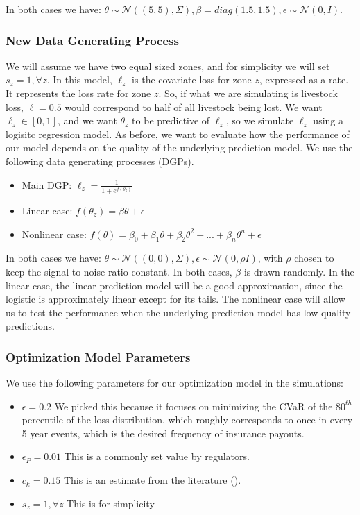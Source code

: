 \documentclass[11pt]{article}
\begin{document}
    In both cases we have: $\theta \sim \mathcal{N}((5,5),\Sigma), \beta = diag(1.5,1.5), \epsilon \sim \mathcal{N}(0,I)$.

\subsubsection{New Data Generating Process}
 We will assume we have two equal sized zones, and for simplicity we will set $s_z = 1, \forall z$. In this model, $\ell_z$ is the covariate loss for zone $z$, expressed as a rate. It represents the loss rate for zone $z$. So, if what we are simulating is livestock loss, $\ell=0.5$ would correspond to half of all livestock being lost. We want $\ell_z \in [0,1]$, and we want $\theta_z$ to be predictive of $\ell_z$, so we simulate $\ell_z$ using a logisitc regression model. As before, we want to evaluate how the performance of our model depends on the quality of the underlying prediction model. We use the following data generating processes (DGPs).

\begin{itemize}
    \item Main DGP: $\ell_z = \frac{1}{1+e^{f(\theta_z)}}$
    \item Linear case: $f(\theta_z) = \beta \theta + \epsilon$
    \item Nonlinear case: $f(\theta) = \beta_0 + \beta_1 \theta + \beta_2 \theta^2 + ... + \beta_n \theta^n+ \epsilon$
  \end{itemize}

In both cases we have: $\theta \sim \mathcal{N}((0,0),\Sigma), \epsilon \sim \mathcal{N}(0,\rho I)$, with $\rho$ chosen to keep the signal to noise ratio constant. In both cases, $\beta$ is drawn randomly. In the linear case, the linear prediction model will be a good approximation, since the logistic  is approximately linear except for its tails. The nonlinear case will allow us to test the performance when the underlying prediction model has low quality predictions. 


   \subsubsection{Optimization Model Parameters}
     We use the following parameters for our optimization model in the simulations:

     \begin{itemize}
       \item $\epsilon=0.2$ We picked this because it focuses on minimizing the CVaR of the $80^{th}$ percentile of the loss distribution, which roughly corresponds to once in every 5 year events, which is the desired frequency of insurance payouts.  
       \item $\epsilon_P=0.01$ This is a commonly set value by regulators.  
       \item $c_k=0.15$ This is an estimate from the literature (\cite{kielholz2000cost}). 
       \item $s_z = 1, \forall z$ This is for simplicity
    \end{itemize}
\end{document}

